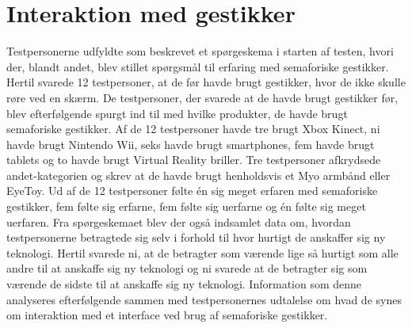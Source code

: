 \section{Interaktion med gestikker}
\label{TestresultaterInteraktioner}
%
Testpersonerne udfyldte som beskrevet et spørgeskema i starten af testen, hvori der, blandt andet, blev stillet spørgsmål til erfaring med semaforiske gestikker. Hertil svarede 12 testpersoner, at de før havde brugt gestikker, hvor de ikke skulle røre ved en skærm. De testpersoner, der svarede at de havde brugt gestikker før, blev efterfølgende spurgt ind til med hvilke produkter, de havde brugt semaforiske gestikker. Af de 12 testpersoner havde tre brugt Xbox Kinect, ni havde brugt Nintendo Wii, seks havde brugt smartphones, fem havde brugt tablets og to havde brugt Virtual Reality briller. Tre testpersoner afkrydsede andet-kategorien og skrev at de havde brugt henholdsvis et Myo armbånd eller EyeToy. Ud af de 12 testpersoner følte én sig meget erfaren med semaforiske gestikker, fem følte sig erfarne, fem følte sig uerfarne og én følte sig meget uerfaren. Fra spørgeskemaet blev der også indsamlet data om, hvordan testpersonerne betragtede sig selv i forhold til hvor hurtigt de anskaffer sig ny teknologi. Hertil svarede ni, at de betragter som værende lige så hurtigt som alle andre til at anskaffe sig ny teknologi og ni svarede at de betragter sig som værende de sidste til at anskaffe sig ny teknologi. Information som denne analyseres efterfølgende sammen med testpersonernes udtalelse om hvad de synes om interaktion med et interface ved brug af semaforiske gestikker.  \blankline


